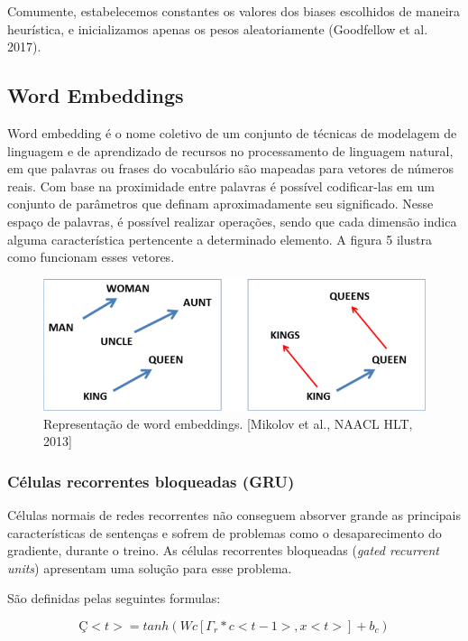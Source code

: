 \documentclass[12pt]{article}
\begin{document}
Comumente, estabelecemos constantes os valores dos biases escolhidos de maneira heurística, e inicializamos apenas os pesos aleatoriamente (Goodfellow et al. 2017).

\subsection{Word Embeddings}

Word embedding é o nome coletivo de um conjunto de técnicas de modelagem de linguagem e de aprendizado de recursos no processamento de linguagem natural, em que palavras ou frases do vocabulário são mapeadas para vetores de números reais. Com base na proximidade entre palavras é possível codificar-las em um conjunto de parâmetros que definam aproximadamente seu significado. Nesse espaço de palavras, é possível realizar operações, sendo que cada dimensão indica alguma característica pertencente a determinado elemento. A figura 5 ilustra como funcionam esses vetores.
\begin{figure}
  \centering
  \includegraphics[width=1\textwidth]{images/wordembeddings.png}
  \caption{
    Representação de word embeddings. [Mikolov et al., NAACL HLT, 2013]
  }
  \label{}
\end{figure}

\subsubsection{Células recorrentes bloqueadas (GRU)}

Células normais de redes recorrentes não conseguem absorver grande as principais características de sentenças e sofrem de problemas como o desaparecimento do gradiente, durante o treino. As células recorrentes bloqueadas (\textit{gated recurrent units}) apresentam uma solução para esse problema.

São definidas pelas seguintes formulas:

\begin{equation}
    Ç<t> = tanh(Wc[\Gamma_r * c<t-1>, x<t>]+b_c)
\end{equation}
\end{document}
